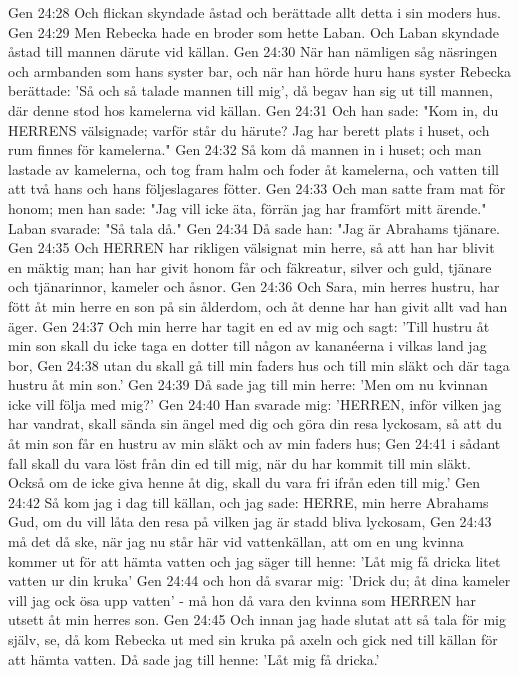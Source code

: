 Gen 24:28  Och flickan skyndade åstad och berättade allt detta i sin moders hus.
Gen 24:29  Men Rebecka hade en broder som hette Laban. Och Laban skyndade åstad till mannen därute vid källan.
Gen 24:30  När han nämligen såg näsringen och armbanden som hans syster bar, och när han hörde huru hans syster Rebecka berättade: 'Så och så talade mannen till mig', då begav han sig ut till mannen, där denne stod hos kamelerna vid källan.
Gen 24:31  Och han sade: "Kom in, du HERRENS välsignade; varför står du härute? Jag har berett plats i huset, och rum finnes för kamelerna."
Gen 24:32  Så kom då mannen in i huset; och man lastade av kamelerna, och tog fram halm och foder åt kamelerna, och vatten till att två hans och hans följeslagares fötter.
Gen 24:33  Och man satte fram mat för honom; men han sade: "Jag vill icke äta, förrän jag har framfört mitt ärende." Laban svarade: "Så tala då."
Gen 24:34  Då sade han: "Jag är Abrahams tjänare.
Gen 24:35  Och HERREN har rikligen välsignat min herre, så att han har blivit en mäktig man; han har givit honom får och fäkreatur, silver och guld, tjänare och tjänarinnor, kameler och åsnor.
Gen 24:36  Och Sara, min herres hustru, har fött åt min herre en son på sin ålderdom, och åt denne har han givit allt vad han äger.
Gen 24:37  Och min herre har tagit en ed av mig och sagt: 'Till hustru åt min son skall du icke taga en dotter till någon av kananéerna i vilkas land jag bor,
Gen 24:38  utan du skall gå till min faders hus och till min släkt och där taga hustru åt min son.'
Gen 24:39  Då sade jag till min herre: 'Men om nu kvinnan icke vill följa med mig?'
Gen 24:40  Han svarade mig: 'HERREN, inför vilken jag har vandrat, skall sända sin ängel med dig och göra din resa lyckosam, så att du åt min son får en hustru av min släkt och av min faders hus;
Gen 24:41  i sådant fall skall du vara löst från din ed till mig, när du har kommit till min släkt. Också om de icke giva henne åt dig, skall du vara fri ifrån eden till mig.'
Gen 24:42  Så kom jag i dag till källan, och jag sade: HERRE, min herre Abrahams Gud, om du vill låta den resa på vilken jag är stadd bliva lyckosam,
Gen 24:43  må det då ske, när jag nu står här vid vattenkällan, att om en ung kvinna kommer ut för att hämta vatten och jag säger till henne: 'Låt mig få dricka litet vatten ur din kruka'
Gen 24:44  och hon då svarar mig: 'Drick du; åt dina kameler vill jag ock ösa upp vatten' - må hon då vara den kvinna som HERREN har utsett åt min herres son.
Gen 24:45  Och innan jag hade slutat att så tala för mig själv, se, då kom Rebecka ut med sin kruka på axeln och gick ned till källan för att hämta vatten. Då sade jag till henne: 'Låt mig få dricka.'
